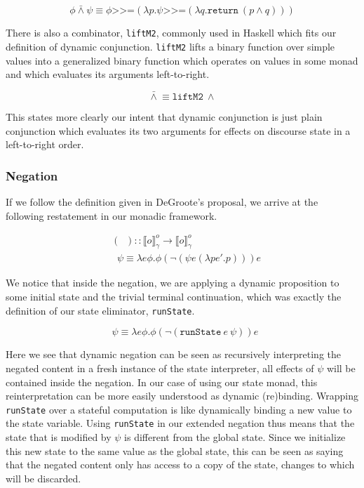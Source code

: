 \documentclass{article}
\newcommand{\dand}{\mathbin{\bar{\land}}}
\newcommand{\dnot}{\mathop{\bar{\lnot}}}
\newcommand{\hsbind}{\mathbin{\texttt{>>=}}}
\newcommand{\statecps}[3]{\llbracket #3 \rrbracket^{#2}_{#1}}
\begin{document}
$$
\phi \dand \psi \equiv \phi \hsbind (\lambda p.
                       \psi \hsbind (\lambda q.
                       \texttt{return}\ (p \land q)))
$$

There is also a combinator, \texttt{liftM2}, commonly used in Haskell which
fits our definition of dynamic conjunction. \texttt{liftM2} lifts a binary
function over simple values into a generalized binary function which operates
on values in some monad and which evaluates its arguments left-to-right.

$$
\dand \equiv \texttt{liftM2}\ \land
$$

This states more clearly our intent that dynamic conjunction is just plain
conjunction which evaluates its two arguments for effects on discourse state
in a left-to-right order.


\subsubsection{Negation}

If we follow the definition given in DeGroote's proposal, we arrive at the
following restatement in our monadic framework.

\begin{align*}
& (\dnot) :: \statecps{\gamma}{o}{o} \to \statecps{\gamma}{o}{o} \\
& \dnot \psi \equiv \lambda e \phi. \phi (\lnot (\psi e (\lambda p e'. p))) e
\end{align*}

We notice that inside the negation, we are applying a dynamic proposition to
some initial state and the trivial terminal continuation, which was exactly
the definition of our state eliminator, \texttt{runState}.

$$
\dnot \psi \equiv \lambda e \phi. \phi (\lnot (\texttt{runState}\ e\ \psi)) e
$$

Here we see that dynamic negation can be seen as recursively interpreting the
negated content in a fresh instance of the state interpreter, all effects of
$\psi$ will be contained inside the negation. In our case of using our state
monad, this reinterpretation can be more easily understood as dynamic
(re)binding. Wrapping \texttt{runState} over a stateful computation is like
dynamically binding a new value to the state variable. Using \texttt{runState}
in our extended negation thus means that the state that is modified by $\psi$
is different from the global state. Since we initialize this new state to the
same value as the global state, this can be seen as saying that the negated
content only has access to a copy of the state, changes to which will be
discarded.
\end{document}
